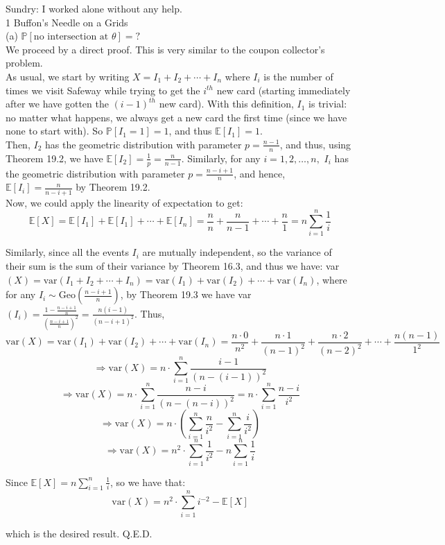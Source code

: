 \documentclass{article}
\begin{document}
Sundry: I worked alone without any help. \\[1cm]
{\Large 1 Buffon’s Needle on a Grids} \\[.5cm]
{\color{red} (a) $\mathbb{P}[\text{no intersection at } \theta] = ?$} \\

We proceed by a direct proof. This is very similar to the coupon collector's problem. \\

As usual, we start by writing $X = I_1 + I_2 + \cdots + I_n$ where $I_i$ is the number of times we visit Safeway while trying to get the $i^{th}$ new card (starting immediately after we have gotten the $(i-1)^{th}$ new card). With this definition, $I_1$ is trivial: no matter what happens, we always get a new card the first time (since we have none to start with). So $\mathbb{P}[I_1 = 1] = 1$, and thus $\mathbb{E}[I_1] = 1$. \\

Then, $I_2$ has the geometric distribution with parameter $p = \frac{n-1}{n}$, and thus, using Theorem 19.2, we have $\mathbb{E}[I_2] = \frac{1}{p} = \frac{n}{n-1}$. Similarly, for any $i = 1,2,\dots,n,$ $I_i$ has the geometric distribution with parameter
$p = \frac{n-i+1}{n}$, and hence, $\mathbb{E}[I_i] = \frac{n}{n-i+1}$ by Theorem 19.2. \\

Now, we could apply the linearity of expectation to get:
$$\mathbb{E}[X] = \mathbb{E}[I_1] + \mathbb{E}[I_1] + \cdots + \mathbb{E}[I_n] = \frac{n}{n} + \frac{n}{n-1} + \cdots + \frac{n}{1} = n\sum\limits_{i=1}^n \frac{1}{i}$$

Similarly, since all the events $I_i$ are mutually independent, so the variance of their sum is the sum of their variance by Theorem 16.3, and thus we have:
var$(X) = \text{var}(I_1 + I_2 + \cdots + I_n) = \text{var}(I_1) + \text{var}(I_2) + \cdots + \text{var}(I_n)$, where for any $I_i\sim\text{Geo}(\frac{n-i+1}{n})$, by Theorem 19.3 we have
var$(I_i) = \frac{1 - \frac{n-i+1}{n}}{(\frac{n-i+1}{n})^2} =
\frac{n(i-1)}{(n-i+1)^2}$. Thus,
$$\text{var}(X) =
\text{var}(I_1) + \text{var}(I_2) + \cdots + \text{var}(I_n) =
\frac{n\cdot0}{n^2} + \frac{n\cdot1}{(n-1)^2} + \frac{n\cdot2}{(n-2)^2} + \cdots + \frac{n(n-1)}{1^2}$$
$$\Longrightarrow \text{var}(X) = n\cdot\sum\limits_{i=1}^{n} \frac{i-1}{(n-(i-1))^2}$$
$$\Longrightarrow \text{var}(X) = n\cdot\sum\limits_{i=1}^{n} \frac{n-i}{(n-(n-i))^2} = n\cdot\sum\limits_{i=1}^{n} \frac{n-i}{i^2}$$
$$\Longrightarrow \text{var}(X) = n\cdot(\sum\limits_{i=1}^{n} \frac{n}{i^2} - \sum\limits_{i=1}^{n} \frac{i}{i^2})$$
$$\Longrightarrow \text{var}(X) = n^2\cdot\sum\limits_{i=1}^{n} \frac{1}{i^2} - n\sum\limits_{i=1}^{n} \frac{1}{i}$$

Since $\mathbb{E}[X] = n\sum\limits_{i=1}^n \frac{1}{i}$, so we have that:
$$\text{var}(X) = n^2\cdot\sum\limits_{i=1}^{n} i^{-2} - \mathbb{E}[X]$$

which is the desired result. Q.E.D.
\end{document}
